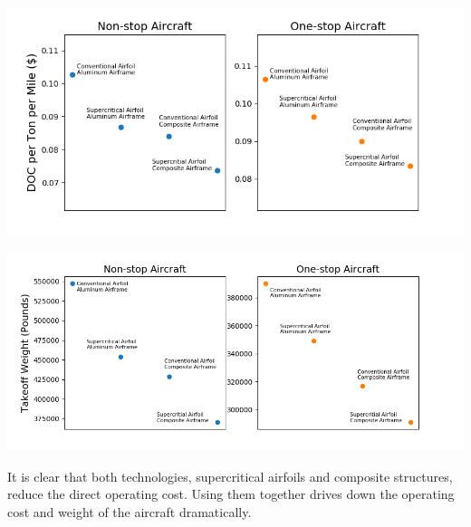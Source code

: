 \documentclass{article}
\begin{document}
        \begin{center}
            \includegraphics[scale=0.7]{tech.PNG}
            \label{fig:doc}
        \end{center}

        \begin{center}
            \includegraphics[scale=0.7]{tech_weight.PNG}
            \label{fig:weight}
        \end{center}

        \begin{flushleft}
            It is clear that both technologies, supercritical airfoils and
            composite structures, reduce the direct operating cost. Using them
            together drives down the operating cost and weight of the aircraft
            dramatically.
        \end{flushleft}
\end{document}
